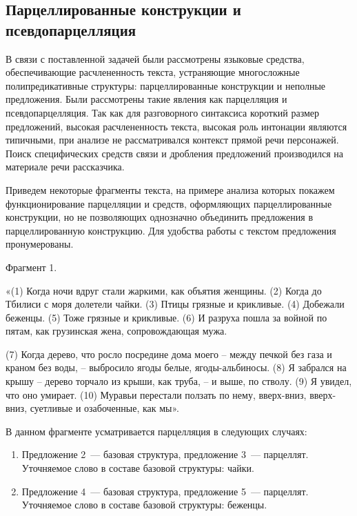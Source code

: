\documentclass{kursa4}
\begin{document}
{{      \subsection{Парцеллированные конструкции и псевдопарцелляция}

      В связи с поставленной задачей были рассмотрены языковые средства,
      обеспечивающие расчлененность текста, устраняющие многосложные
      полипредикативные структуры: парцеллированные конструкции и неполные
      предложения. Были рассмотрены такие явления как парцелляция и
      псевдопарцелляция. Так как для разговорного синтаксиса короткий размер
      предложений, высокая расчлененность текста, высокая роль интонации
      являются типичными, при анализе не рассматривался контекст прямой
      речи персонажей. Поиск специфических средств связи и дробления
      предложений производился на материале речи рассказчика. 

      Приведем некоторые фрагменты текста, на примере анализа которых
      покажем функционирование парцелляции и средств, оформляющих
      парцеллированные конструкции, но не позволяющих однозначно объединить
      предложения в парцеллированную конструкцию. Для удобства работы с текстом предложения пронумерованы.

      Фрагмент 1. 

      «(1) Когда ночи вдруг стали жаркими, как объятия женщины. (2) Когда до Тбилиси с моря долетели чайки. (3) Птицы грязные и крикливые. (4) Добежали беженцы. (5) Тоже грязные и крикливые. (6) И разруха пошла за войной по пятам, как грузинская жена, сопровождающая мужа.

      (7) Когда дерево, что росло посредине дома моего – между печкой без газа и краном без воды, – выбросило ягоды белые, ягоды-альбиносы. (8) Я забрался на крышу – дерево торчало из крыши, как труба, – и выше, по стволу. (9) Я увидел, что оно
      умирает. (10) Муравьи перестали ползать по нему, вверх-вниз,
      вверх-вниз, суетливые и озабоченные, как мы». 

      В данном фрагменте усматривается
      парцелляция в следующих случаях:

      \begin{enumerate}
        \item Предложение 2~--- базовая структура, предложение 3~--- парцеллят. \newline
        Уточняемое слово в составе базовой структуры: чайки. 

        \item Предложение 4~--- базовая структура, предложение 5~--- парцеллят. \newline
        Уточняемое слово в составе базовой структуры: беженцы. 
      \end{enumerate}

}}
\end{document}
